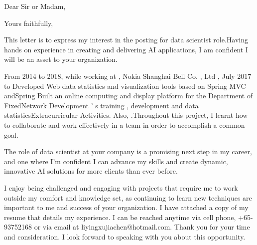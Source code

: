 \documentclass[11pt,a4paper,sans]{moderncv}        %
\begin{document}
\recipient{\quad}{\quad}
\date{March 09 2020}
\opening{Dear Sir or Madam,}
\closing{Yours faithfully,}
\makelettertitle


This letter is to express my interest in the posting for data scientist role.Having hands on experience in creating and delivering AI applications, I am confident I will be an asset to your organization.


From 2014 to 2018, while working at , Nokia Shanghai Bell Co. , Ltd , July 2017 to Developed Web data statistics and visualization tools based on Spring MVC andSpring Built an online computing and display platform for the Department of FixedNetwork Development ’ s training , development and data statisticsExtracurricular Activities. Also, .Throughout this project, I learnt how to collaborate and work effectively in a team in order to accomplish a common goal.


The role of data scientist at your company is a promising next step in my career, and one where I’m confident I can advance my skills and create dynamic, innovative AI solutions for more clients than ever before.

I enjoy being challenged and engaging with projects that require me to work outside my comfort and knowledge set, as continuing to learn new techniques are important to me and success of your organization.
I have attached a copy of my resume that details my experience. I can be reached anytime via cell phone, +65-93752168 or via email at liyingxujiachen@hotmail.com.
Thank you for your time and consideration. I look forward to speaking with you about this opportunity.


\makeletterclosing
\end{document}
